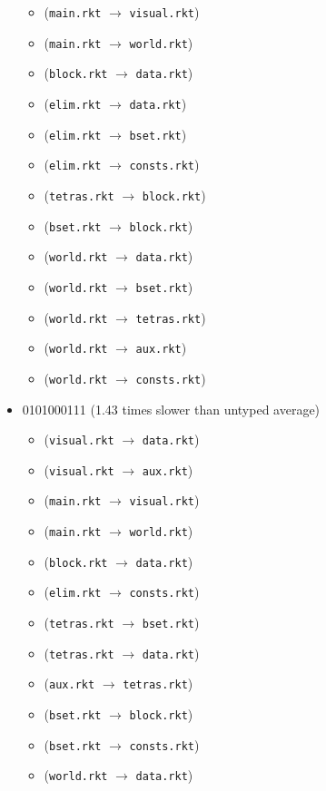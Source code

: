 \documentclass{article}
\newcommand{\mono}[1]{\texttt{#1}}
\begin{document}
\begin{itemize}
\begin{itemize}
  \item (\mono{main.rkt} $\rightarrow$ \mono{visual.rkt})
  \item (\mono{main.rkt} $\rightarrow$ \mono{world.rkt})
  \item (\mono{block.rkt} $\rightarrow$ \mono{data.rkt})
  \item (\mono{elim.rkt} $\rightarrow$ \mono{data.rkt})
  \item (\mono{elim.rkt} $\rightarrow$ \mono{bset.rkt})
  \item (\mono{elim.rkt} $\rightarrow$ \mono{consts.rkt})
  \item (\mono{tetras.rkt} $\rightarrow$ \mono{block.rkt})
  \item (\mono{bset.rkt} $\rightarrow$ \mono{block.rkt})
  \item (\mono{world.rkt} $\rightarrow$ \mono{data.rkt})
  \item (\mono{world.rkt} $\rightarrow$ \mono{bset.rkt})
  \item (\mono{world.rkt} $\rightarrow$ \mono{tetras.rkt})
  \item (\mono{world.rkt} $\rightarrow$ \mono{aux.rkt})
  \item (\mono{world.rkt} $\rightarrow$ \mono{consts.rkt})
  \end{itemize}
\item 0101000111 (1.43 times slower than untyped average)
  \begin{itemize}
  \item (\mono{visual.rkt} $\rightarrow$ \mono{data.rkt})
  \item (\mono{visual.rkt} $\rightarrow$ \mono{aux.rkt})
  \item (\mono{main.rkt} $\rightarrow$ \mono{visual.rkt})
  \item (\mono{main.rkt} $\rightarrow$ \mono{world.rkt})
  \item (\mono{block.rkt} $\rightarrow$ \mono{data.rkt})
  \item (\mono{elim.rkt} $\rightarrow$ \mono{consts.rkt})
  \item (\mono{tetras.rkt} $\rightarrow$ \mono{bset.rkt})
  \item (\mono{tetras.rkt} $\rightarrow$ \mono{data.rkt})
  \item (\mono{aux.rkt} $\rightarrow$ \mono{tetras.rkt})
  \item (\mono{bset.rkt} $\rightarrow$ \mono{block.rkt})
  \item (\mono{bset.rkt} $\rightarrow$ \mono{consts.rkt})
  \item (\mono{world.rkt} $\rightarrow$ \mono{data.rkt})

\end{itemize}
\end{itemize}
\end{document}
